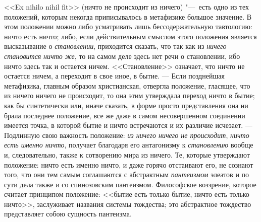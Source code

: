 <<Ex nihilo nihil fit>> (ничто не происходит из ничего) "---~есть одно из тех
положений, которым некогда приписывалось в метафизике большое значение. В
этом положении можно либо усматривать лишь бессодержательную тавтологию:
ничто есть ничто; либо, если действительным смыслом этого положения
является высказывание о {\em становлении}, приходится
сказать, что так как из {\em ничего становится}
{\em ничто же}, то на самом деле здесь нет речи о
становлении, ибо ничто здесь так и остается ничем. <<Становление>> означает,
что ничто не остается ничем, а переходит в свое иное, в бытие. --- Если
позднейшая метафизика, главным образом христианская, отвергла положение,
гласящее, что из ничего ничего не происходит, то она этим утверждала
переход ничто в бытие; как бы синтетически или, иначе сказать, в форме
просто представления она ни брала последнее положение, все же даже в самом
несовершенном соединении имеется точка, в которой бытие и ничто встречаются
и их различие исчезает. --- Подлинную свою важность положение:
{\em из ничего ничего не происходит},
{\em ничто есть именно ничто}, получает благодаря его
антагонизму к {\em становлению} вообще и,
следовательно, также к сотворению мира из ничего. Те, которые утверждают
положение: ничто есть именно ничто, и даже горячо отстаивают его, не
сознают того, что они тем самым соглашаются с абстрактным
{\em пантеизмом} элеатов и по сути дела также и со
спинозовским пантеизмом. Философское воззрение, которое считает принципом
положение: <<бытие есть только бытие, ничто есть только ничто>>, заслуживает
названия системы тождества; это абстрактное тождество представляет собою
сущность пантеизма.

